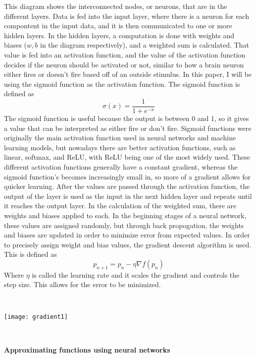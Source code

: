 \documentclass[12 pt]{article}
\theoremstyle{definition}
\begin{document}
This diagram shows the interconnected nodes, or neurons, that are in the different layers. Data is fed into the input layer, where there is a neuron for each compontent in the input data, and it is then communicated to one or more hidden layers. In the hidden layers, a computation is done with weights and biases ($w,b$ in the diagram respectively), and a weighted sum is calculated. That value is fed into an activation function, and the value of the activation function decides if the neuron should be activated or not, similar to how a brain neuron either fires or doesn't fire based off of an outside stimulus. In this paper, I will be using the sigmoid function as the activation function. The sigmoid function is defined as 
\begin{equation*}
\sigma(x) = \frac{1}{1 + e^{-x}}
\end{equation*}
The sigmoid function is useful because the output is between 0 and 1, so it gives a value that can be interpreted as either fire or don't fire. Sigmoid functions were originally the main activation function used in neural networks and machine learning models, but nowadays there are better activation functions, such as linear, softmax, and ReLU, with ReLU being one of the most widely used. These different activation functions generally have a constant gradient, whereas the sigmoid function's becomes increasingly small in, so more of a gradient allows for quicker learning. After the values are passed through the activation function, the output of the layer is used as the input in the next hidden layer and repeats until it reaches the output layer. In the calculation of the weighted sum, there are weights and biases applied to each. In the beginning stages of a neural network, these values are assigned randomly, but through back propogation, the weights and biases are updated in order to minimize error from expected values. In order to precisely assign weight and bias values, the gradient descent algorithm is used. This is defined as 
\begin{equation*}
p_{n+1} = p_{n} - \eta \nabla f(p_{n})
\end{equation*}
Where $\eta$ is called the learning rate and it scales the gradient and controls the step size. This allows for the error to be minimized. 

\

\texttt{[image: gradient1]}

\

\textbf{Approximating functions using neural networks}
\end{document}
